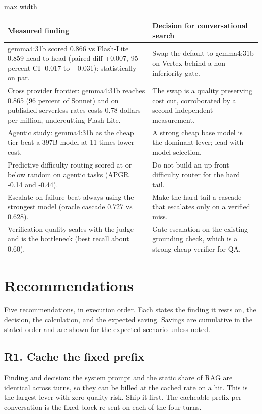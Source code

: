 \documentclass[11pt]{uce-report}
\begin{document}
\vspace{0.4em}
\noindent\begin{adjustbox}{max width=\linewidth}\begin{tabular}{p{7.5cm}p{7.5cm}}
\toprule
\textbf{Measured finding} & \textbf{Decision for conversational search} \\
\midrule
gemma4:31b scored 0.866 vs Flash-Lite 0.859 head to head (paired diff +0.007, 95 percent CI -0.017 to +0.031): statistically on par. & Swap the default to gemma4:31b on Vertex behind a non inferiority gate. \\
Cross provider frontier: gemma4:31b reaches 0.865 (96 percent of Sonnet) and on published serverless rates costs 0.78 dollars per million, undercutting Flash-Lite. & The swap is a quality preserving cost cut, corroborated by a second independent measurement. \\
Agentic study: gemma4:31b as the cheap tier beat a 397B model at 11 times lower cost. & A strong cheap base model is the dominant lever; lead with model selection. \\
Predictive difficulty routing scored at or below random on agentic tasks (APGR -0.14 and -0.44). & Do not build an up front difficulty router for the hard tail. \\
Escalate on failure beat always using the strongest model (oracle cascade 0.727 vs 0.628). & Make the hard tail a cascade that escalates only on a verified miss. \\
Verification quality scales with the judge and is the bottleneck (best recall about 0.60). & Gate escalation on the existing grounding check, which is a strong cheap verifier for QA. \\
\bottomrule
\end{tabular}\end{adjustbox}

\section{Recommendations}
Five recommendations, in execution order. Each states the finding it rests on, the decision, the calculation, and the expected saving. Savings are cumulative in the stated order and are shown for the expected scenario unless noted.


\subsection{R1. Cache the fixed prefix}
Finding and decision: the system prompt and the static share of RAG are identical across turns, so they can be billed at the cached rate on a hit. This is the largest lever with zero quality risk. Ship it first. The cacheable prefix per conversation is the fixed block re-sent on each of the four turns.
\end{document}
